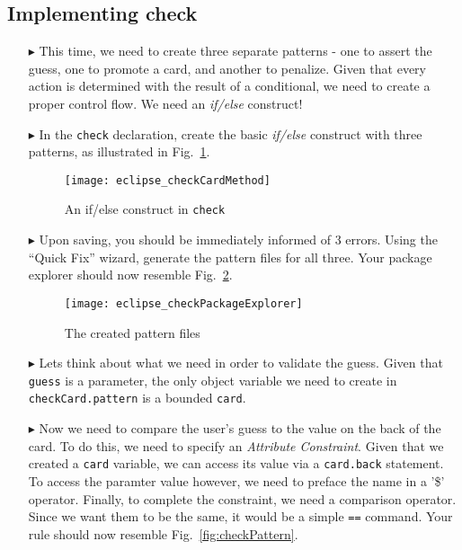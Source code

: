 \newpage
\subsection{Implementing check}
\texHeader
\hypertarget{checkCard tex}{}
 
\begin{itemize}
   
\item[$\blacktriangleright$] This time, we need to create three separate patterns - one to assert the guess, one to promote a card, and another to penalize.
Given that every action is determined with the result of a conditional, we need to create a proper control flow. We need an \emph{if/else} construct!

\item[$\blacktriangleright$] In the \texttt{check} declaration, create the basic \emph{if/else} construct with three patterns, as illustrated in
Fig.~\ref{fig:checkDec}.

\begin{figure}[htbp]
\begin{center}
  \texttt{[image: eclipse\_checkCardMethod]}
  \caption{An if/else construct in \texttt{check}}
  \label{fig:checkDec}
\end{center}
\end{figure} 

\item[$\blacktriangleright$] Upon saving, you should be immediately informed of 3 errors. Using the ``Quick Fix'' wizard, generate the pattern files for all
three. Your package explorer should now resemble Fig.~\ref{fig:checkPatternsExplorer}.

\begin{figure}[htbp]
\begin{center}
  \texttt{[image: eclipse\_checkPackageExplorer]}
  \caption{The created pattern files}
  \label{fig:checkPatternsExplorer}
\end{center}
\end{figure} 

\item[$\blacktriangleright$] Lets think about what we need in order to validate the guess. Given that \texttt{guess} is a parameter, the only object variable
we need to create in \texttt{checkCard.pattern} is a bounded \texttt{card}.

\item[$\blacktriangleright$] Now we need to compare the user's guess to the value on the back of the card. To do this, we need to specify an \emph{Attribute
Constraint}. Given that we created a \texttt{card} variable, we can access its value via a \texttt{card.back} statement. To access the paramter
value however, we need to preface the name in a '\$' operator. Finally, to complete the constraint, we need a comparison operator. Since we want them
to be the same, it would be a simple \texttt{==} command. Your rule should now resemble Fig.~\ref{fig:checkPattern}.


\end{itemize}
